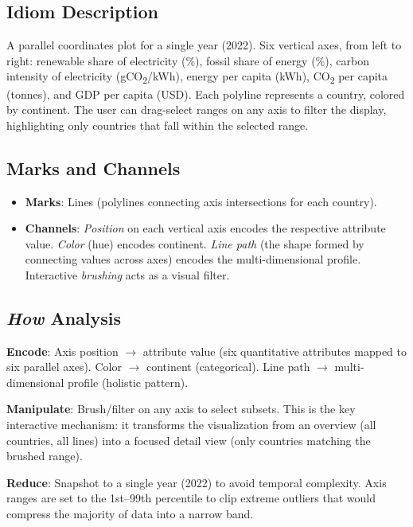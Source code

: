 \documentclass[10pt]{article}
\begin{document}
\subsection{Idiom Description}

A parallel coordinates plot for a single year (2022). Six vertical axes, from left to right: renewable share of electricity (\%), fossil share of energy (\%), carbon intensity of electricity (gCO\textsubscript{2}/kWh), energy per capita (kWh), CO\textsubscript{2} per capita (tonnes), and GDP per capita (USD). Each polyline represents a country, colored by continent. The user can drag-select ranges on any axis to filter the display, highlighting only countries that fall within the selected range.

\subsection{Marks and Channels}

\begin{itemize}
    \item \textbf{Marks}: Lines (polylines connecting axis intersections for each country).
    \item \textbf{Channels}: \emph{Position} on each vertical axis encodes the respective attribute value. \emph{Color} (hue) encodes continent. \emph{Line path} (the shape formed by connecting values across axes) encodes the multi-dimensional profile. Interactive \emph{brushing} acts as a visual filter.
\end{itemize}

\subsection{\emph{How} Analysis}

\textbf{Encode}: Axis position $\rightarrow$ attribute value (six quantitative attributes mapped to six parallel axes). Color $\rightarrow$ continent (categorical). Line path $\rightarrow$ multi-dimensional profile (holistic pattern).

\textbf{Manipulate}: Brush/filter on any axis to select subsets. This is the key interactive mechanism: it transforms the visualization from an overview (all countries, all lines) into a focused detail view (only countries matching the brushed range).

\textbf{Reduce}: Snapshot to a single year (2022) to avoid temporal complexity. Axis ranges are set to the 1st--99th percentile to clip extreme outliers that would compress the majority of data into a narrow band.
\end{document}
